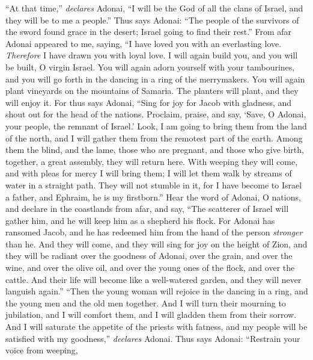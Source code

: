 \begin{biblechapter} %
\verse “At that time,” \textit{declares} Adonai, “I will be the God of all the clans of Israel, 
and they will be to me a people.”
\verse Thus says Adonai:
\verse “The people of the survivors of the sword found grace in the desert; 
Israel going to find their rest.”
\verse From afar Adonai appeared to me, saying, 
“I have loved you with an everlasting love. 
\textit{Therefore} I have drawn you with loyal love.
\verse I will again build you, 
and you will be built, O virgin Israel. 
You will again adorn yourself with your tambourines, 
and you will go forth in the dancing in a ring of the merrymakers.
\verse You will again plant vineyards on the mountains of Samaria. 
The planters will plant, and they will enjoy it.
\verse For thus says Adonai,
\verse “Sing for joy for Jacob with gladness, 
and shout out for the head of the nations. 
Proclaim, praise, and say, 
‘Save, O Adonai, your people, the remnant of Israel.’
\verse Look, I am going to bring them from the land of the north, 
and I will gather them from the remotest part of the earth. 
Among them the blind, and the lame, 
those who are pregnant, and those who give birth, 
together, a great assembly, 
they will return here.
\verse With weeping they will come, 
and with pleas for mercy I will bring them; 
I will let them walk by streams of water in a straight path. 
They will not stumble in it, 
for I have become to Israel a father, 
and Ephraim, he is my firstborn.”
\verse Hear the word of Adonai, O nations, 
and declare in the coastlands from afar, and say, 
“The scatterer of Israel will gather him, 
and he will keep him as a shepherd his flock.
\verse For Adonai has ransomed Jacob, 
and he has redeemed him from the hand of the person \textit{stronger} than he.
\verse And they will come, 
and they will sing for joy on the height of Zion, 
and they will be radiant over the goodness of Adonai, 
over the grain, and over the wine, and over the olive oil, 
and over the young ones of the flock, and over the cattle. 
And their life will become like a well-watered garden, 
and they will never languish again.”
\verse “Then the young woman will rejoice in the dancing in a ring, 
and the young men and the old men together. 
And I will turn their mourning to jubilation, 
and I will comfort them, 
and I will gladden them from their sorrow.
\verse And I will saturate the appetite of the priests with fatness, 
and my people will be satisfied with my goodness,” \textit{declares} Adonai.
\verse Thus says Adonai:
\verse “Restrain your voice from weeping, 

\end{biblechapter}
